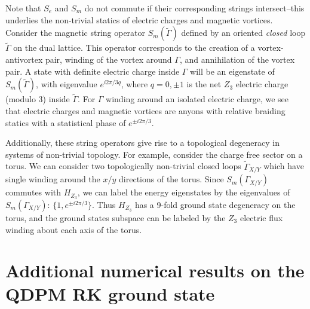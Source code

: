 \documentclass[twocolumn,prb,aps,floatfix,superscriptaddress]{revtex4-1}
\begin{document}
Note that  $S_e$ and $S_m$ do not commute if their corresponding strings intersect--this underlies the non-trivial statics of electric charges and magnetic vortices. Consider the magnetic string operator $S_m(\tilde{\Gamma})$ defined by an oriented \emph{closed} loop $\tilde{\Gamma}$ on the dual lattice. This operator corresponds to the creation of a vortex-antivortex pair, winding of the vortex around $\Gamma$, and annihilation of the vortex pair. A state with definite electric charge inside $\Gamma$ will be an eigenstate of $S_m(\tilde{\Gamma})$, with eigenvalue $e^{ i 2 \pi/3 q}$, where $q=0,\pm1$ is the net $Z_3$ electric charge (modulo 3) inside $\tilde{\Gamma}$. For $\Gamma$ winding around an isolated electric charge, we see that electric charges and magnetic vortices are anyons with relative braiding statics with a statistical phase of $e^{\pm i 2\pi/3}$.

Additionally, these string operators give rise to a topological degeneracy in systems of non-trivial topology. For example, consider the charge free sector on a torus. We can consider two topologically non-trivial closed loops $\tilde{\Gamma}_{X/Y}$ which have single winding around the $x/y$ directions of the torus. Since $S_m(\Gamma_{X/Y})$ commutes with $H_{Z_3}$, we can label the energy eigenstates by the eigenvalues of $S_m(\Gamma_{X/Y})$: $\{1,e^{\pm i 2\pi/3}\}$. Thus $H_{Z_3}$ has a 9-fold ground state degeneracy on the torus, and the ground states subspace can be labeled by the $Z_3$ electric flux winding about each axis of the torus.
            
\section{Additional numerical results on the QDPM RK ground state}
%
\end{document}
